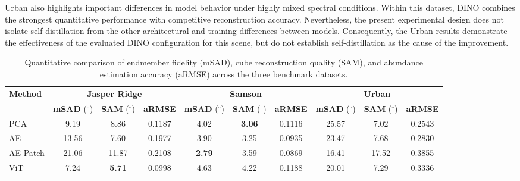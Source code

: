 \documentclass{article}
\begin{document}
Urban also highlights important differences in model behavior under highly mixed spectral conditions. Within this dataset, DINO combines the strongest quantitative performance with competitive reconstruction accuracy. Nevertheless, the present experimental design does not isolate self-distillation from the other architectural and training differences between models. Consequently, the Urban results demonstrate the effectiveness of the evaluated DINO configuration for this scene, but do not establish self-distillation as the cause of the improvement.

\begin{table}[htbp]
    \centering
    \caption{Quantitative comparison of endmember fidelity (mSAD), cube reconstruction quality (SAM), and abundance estimation accuracy (aRMSE) across the three benchmark datasets.}
    \label{tab:quantitative_metrics}
    \small
    \renewcommand{\arraystretch}{1.15}
    \setlength{\tabcolsep}{3pt}
    \begin{tabular}{l ccc ccc ccc}
        \toprule
        \multirow{2}{*}{\textbf{Method}} & \multicolumn{3}{c}{\textbf{Jasper Ridge}} & \multicolumn{3}{c}{\textbf{Samson}} & \multicolumn{3}{c}{\textbf{Urban}} \\
        \cmidrule(lr){2-4} \cmidrule(lr){5-7} \cmidrule(lr){8-10}
         & \shortstack{\textbf{mSAD}\\($^\circ$)} & \shortstack{\textbf{SAM}\\($^\circ$)} & \textbf{aRMSE} & \shortstack{\textbf{mSAD}\\($^\circ$)} & \shortstack{\textbf{SAM}\\($^\circ$)} & \textbf{aRMSE} & \shortstack{\textbf{mSAD}\\($^\circ$)} & \shortstack{\textbf{SAM}\\($^\circ$)} & \textbf{aRMSE} \\
        \midrule
        PCA       & 9.19          & 8.86          & 0.1187          & 4.02          & \textbf{3.06} & 0.1116          & 25.57         & 7.02          & 0.2543 \\
        AE        & 13.56         & 7.60          & 0.1977          & 3.90          & 3.25          & 0.0935          & 23.47         & 7.68          & 0.2830 \\
        AE-Patch & 21.06         & 11.87         & 0.2108          & \textbf{2.79} & 3.59          & 0.0869          & 16.41         & 17.52         & 0.3855 \\
        ViT       & 7.24          & \textbf{5.71} & 0.0998          & 4.63          & 4.22          & 0.1188          & 20.01         & 7.29          & 0.3336 \\

\end{tabular}
\end{table}
\end{document}
